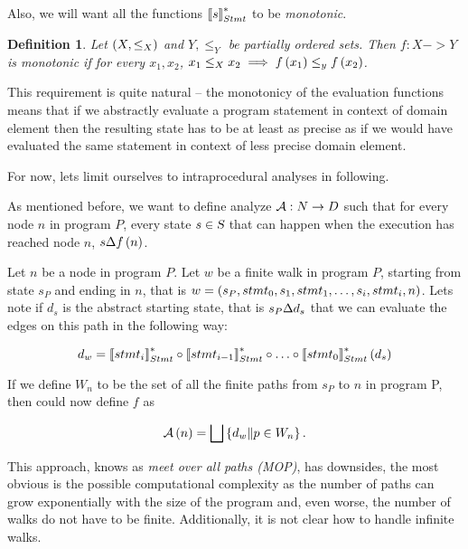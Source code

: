 \documentclass[..thesis.tex]{subfiles}
\newtheorem{defin}{Definition}[section]
\begin{document}
Also, we will want all the functions $\left\llbracket s \right\rrbracket_{Stmt}^{*}$ to be \textit{monotonic}.

\begin{defin}
Let $\left( X, \leq_X \right)$ and $Y, \leq_Y$ be partially ordered sets. Then $f : X -> Y$ is \textit{monotonic} if for every $x_1, x_2$, $x_1 \leq_X x_2 \implies f \left( x_1 \right) \leq_y f \left( x_2 \right)$.   
\end{defin}

This requirement is quite natural -- the monotonicy of the evaluation functions means that if we abstractly evaluate a program statement in context of domain element then the resulting state has to be at least as precise as if we would have evaluated the same statement in context of less precise domain element.  



For now, lets limit ourselves to intraprocedural analyses in following.
 
As mentioned before, we want to define analyze $\mathcal{A} : N \to D$ such that for every node $n$ in program $P$, every state $s \in \textsl{S}$ that can happen when the execution has reached node $n$, $s \Delta f \left( n \right)$.
  
Let $n$ be a node in program $P$. Let $w$ be a finite walk in program $P$, starting from state $s_P$ and ending in $n$, that is $w = \left( s_P, stmt_0, s_1, stmt_1, \ldots, s_i, stmt_i, n \right)$. Lets note if $d_s$ is the abstract starting state, that is $s_P \Delta d_s$  that we can evaluate the edges on this path in the following way:

\begin{equation*}
d_w = \left\llbracket stmt_i \right\rrbracket_{Stmt}^{*} \circ \left\llbracket stmt_{i-1} \right\rrbracket_{Stmt}^{*} \circ \ldots \circ  \left\llbracket stmt_0 \right\rrbracket_{Stmt}^{*} \left( d_s \right)  
\end{equation*}
  
If we define $W_n$ to be the set of all the finite paths from $s_P$ to $n$ in program P, then could now define $f$ as

\begin{equation*}
\mathcal{A} \left( n \right) = \bigsqcup \left\lbrace d_w \| p \in W_n \right\rbrace \text{.} 
\end{equation*}  


This approach, knows as \textit{meet over all  paths (MOP)}, has downsides, the most obvious is the possible computational complexity as the number of paths can grow exponentially with the size of the program and, even worse, the number of walks do not have to be finite. Additionally, it is not clear how to handle infinite walks. 
\end{document}
